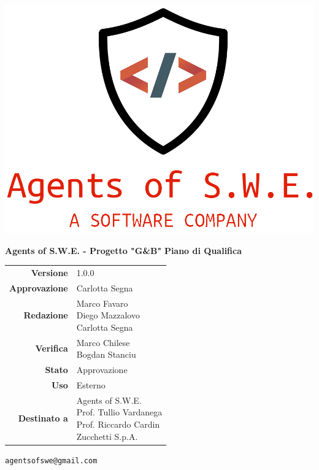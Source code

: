 


\begin{titlepage}
\thispagestyle{empty}

\begin{center}

\includegraphics[scale=0.3]{./images/logo.png} 

\large \textbf{Agents of S.W.E. - Progetto "G\&B"}
\vfill
\Huge \textbf{Piano di Qualifica}
\vfill
\large
\renewcommand{\arraystretch}{1.3}
\begin{tabular}{r|l}
\textbf{Versione} & 1.0.0\\
\textbf{Approvazione} & Carlotta Segna\\
\textbf{Redazione} & \parbox[t]{5cm}{Marco Favaro\\Diego Mazzalovo\\Carlotta Segna}\\
\textbf{Verifica} & \parbox[t]{5cm}{Marco Chilese\\Bogdan Stanciu}\\
\textbf{Stato} & Approvazione\\
\textbf{Uso} & Esterno\\
\textbf{Destinato a} & \parbox[t]{5cm}{Agents of S.W.E. \\Prof. Tullio Vardanega\\Prof. Riccardo Cardin\\Zucchetti S.p.A.}
\end{tabular}
\vfill
\small
\texttt{agentsofswe@gmail.com}
\end{center}
\end{titlepage}

